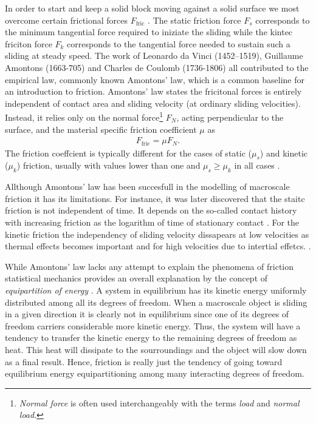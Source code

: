  In order to start and keep a solid block moving against a solid
 surface we most overcome certain frictional forces $F_{\text{fric}}$ \cite{gnecco_meyer_2015}. The static friction force $F_s$ corresponds to the minimum tangential force required to
 iniziate the sliding while the kintec friciton force $F_k$ corresponds to the
 tangential force needed to sustain such a sliding at steady speed. The work of Leonardo da Vinci (1452–1519), Guillaume Amontons (1663-705) and
 Charles de Coulomb (1736-1806) all contributed to the empirical law, commonly known Amontons’ law, which is a common baseline for an introduction to friction. Amontons’ law states the fricitonal forces is entirely independent of contact area and sliding velocity (at ordinary sliding velocities). Instead, it relies only on the normal force\footnote{\textit{Normal force} is often used interchangeably with the terms \textit{load} and \textit{normal load}.} $F_N$, acting perpendicular to the surface, and the material specific friction coefficient $\mu$ as
\begin{align}
  F_{\text{fric}} = \mu F_N.
  \label{eq:amonton}
\end{align}
The friction coeffcient is typically different for the cases of static ($\mu_s$)
and kinetic ($\mu_k$) friction, usually with values lower than one and $\mu_s \ge
\mu_k$ in all cases \cite[p. 6]{gnecco_meyer_2015}. 

Allthough Amontons’ law has been succesfull in the modelling of macroscale friction it has its limitations. For instance, it was later discovered that the staitc friction is not independent of time. It depends on the so-called contact history with increasing friction as the logarithm of time of stationary contact
\cite{dieterich_1972}. For the kinetic friction the independency of sliding
velocity dissapears at low velocities as thermal effects becomes important and
for high velocities due to intertial effetcs. \cite[pp. 5-6]{gnecco_meyer_2015}. 

While Amontons’ law lacks any attempt to explain the phenomena of friction statistical mechanics provides an overall explanation by the concept of \textit{equipartition of energy} \cite{Manini_2016}. A system in equilibrium has its kinetic energy uniformly distributed among all its degrees of freedom. When a macroscale object is sliding in a given direction it is
clearly not in equilibrium since one of its degrees of freedom carriers
considerable more kinetic energy. Thus, the system will have a tendency to
transfer the kinetic energy to the remaining degrees of freedom as heat. This heat will dissipate to the sourroundings and the object will slow down as a final result. Hence, friction is really just the tendency of going toward equilibrium energy equipartitioning among many interacting degrees of freedom. \cite{Manini_2016}

